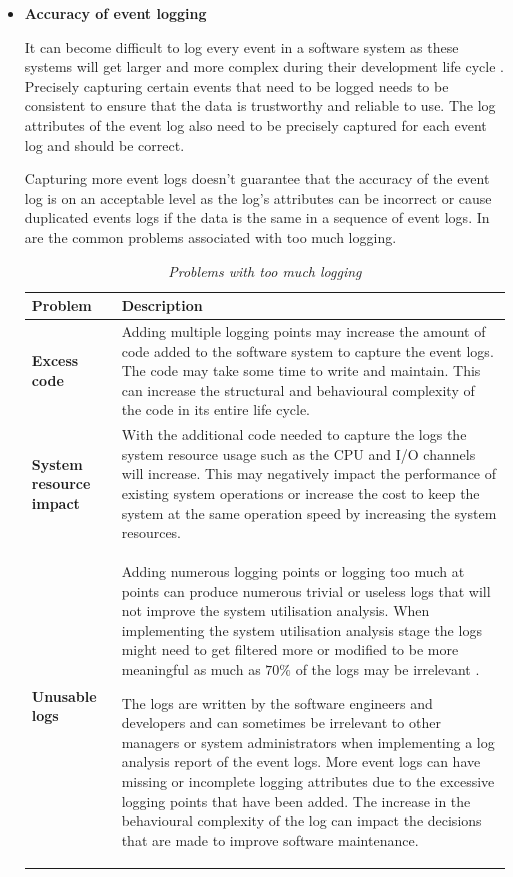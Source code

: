 \clearpage

\begin{itemize}
	\item \textbf{Accuracy of event logging}\par It can become difficult to log every event in a software system as these systems will get larger and more complex during their development life cycle \cite{Stojanov2017}. Precisely capturing certain events that need to be logged needs to be consistent to ensure that the data is trustworthy and reliable to use. The log attributes of the event log also need to be precisely captured for each event log and should be correct.\par Capturing more event logs doesn't guarantee that the accuracy of the event log is on an acceptable level as the log's attributes can be incorrect or cause duplicated events logs if the data is the same in a sequence of event logs. In  are the common problems associated with too much logging.

	\begin{table}[!htb]
		\centering
		\caption[Problems with too much logging]
		{\textit{Problems with too much logging \cite{Zhu2015}}}
		\label{tbl:ch1_loggingTooMuch}
		\begin{tabularx}{\linewidth}{|l|X|}
			\hline \textbf{Problem}  & \textbf{Description} \\
			\hline \textbf{Excess code} & Adding multiple logging points may increase the amount of code added to the software system to capture the event logs. The code may take some time to write and maintain. This can increase the structural and behavioural complexity of the code in its entire life cycle. \\
			\hline \textbf{System resource impact} & With the additional code needed to capture the logs the system resource usage such as the CPU and I/O channels will increase. This may negatively impact the performance of existing system operations or increase the cost to keep the system at the same operation speed by increasing the system resources.\\
			\hline \textbf{Unusable logs} & Adding numerous logging points or logging too much at points can produce numerous trivial or useless logs that will not improve the system utilisation analysis. When implementing the system utilisation analysis stage the logs might need to get filtered more or modified to be more meaningful as much as $70\%$ of the logs may be irrelevant \cite{Fedaghi2010}. \par The logs are written by the software engineers and developers and can sometimes be irrelevant to other managers or system administrators when implementing a log analysis report of the event logs. More event logs can have missing or incomplete logging attributes due to the excessive logging points that have been added. The increase in the behavioural complexity of the log can impact the decisions that are made to improve software maintenance. \\
			\hline
		\end{tabularx}
	\end{table}


\end{itemize}
